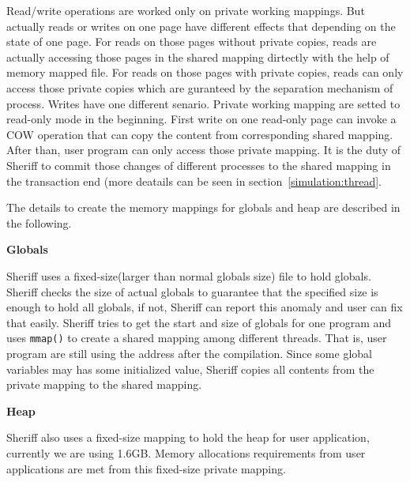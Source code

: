 Read/write operations are worked only on private working mappings. 
But actually reads or writes on one page have different effects that depending on the state of one page.
For reads on those pages without private copies, 
reads are actually accessing those pages in the shared mapping dirtectly with the help of memory mapped file.
For reads on those pages with private copies, 
reads can only access those private copies which are guranteed by the separation mechanism of process. 
Writes have one different senario. Private working mapping are setted to read-only mode in the beginning. 
First write on one read-only page can invoke a COW operation that can copy the content from 
corresponding shared mapping. 
After than, user program can only access those private mapping. 
It is the duty of Sheriff to commit those changes
of different processes to the shared mapping in the transaction end (more deatails can be seen in
section~\ref{simulation:thread}.

The details to create the memory mappings for globals and heap are described in the following.
\par\vspace{3mm}
\noindent
\textbf{Globals}
\par\vspace{3mm}
\noindent
Sheriff uses a fixed-size(larger than normal globals size) file to hold globals. Sheriff checks the size of actual
globals to guarantee that the specified size is enough to hold all globals, if not, Sheriff can report this anomaly and 
user can fix that easily.
Sheriff tries to get the start and size of globals for one program and uses \texttt{mmap()} to create a shared mapping 
among different threads. That is, user program are still using the address after the compilation.
Since some global variables may has some initialized value, Sheriff copies all contents 
from the private mapping to the shared mapping. 

\par\vspace{3mm}
\noindent
\textbf{Heap}
\par\vspace{3mm}
\noindent
Sheriff also uses a fixed-size mapping to hold the heap for user application, currently we are using 1.6GB. Memory allocations 
requirements from user applications are met from this fixed-size private mapping.

